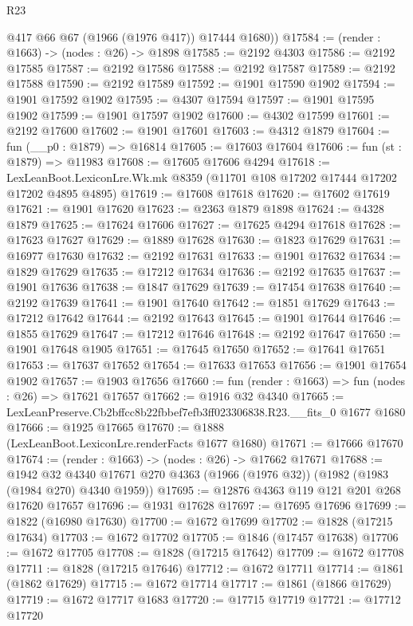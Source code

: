 \begin{lexlean}{R23}
\begin{coremodule}
        @417
        @66
        @67
        (@1966 (@1976 @417))
        @17444
        @1680))
@17584 := (render : @1663) -> (nodes : @26) -> @1898
@17585 := @2192 @4303
@17586 := @2192 @17585
@17587 := @2192 @17586
@17588 := @2192 @17587
@17589 := @2192 @17588
@17590 := @2192 @17589
@17592 := @1901 @17590 @1902
@17594 := @1901 @17592 @1902
@17595 := @4307 @17594
@17597 := @1901 @17595 @1902
@17599 := @1901 @17597 @1902
@17600 := @4302 @17599
@17601 := @2192 @17600
@17602 := @1901 @17601
@17603 := @4312 @1879
@17604 := fun (__p0 : @1879) => @16814
@17605 := @17603 @17604
@17606 := fun (st : @1879) => @11983
@17608 := @17605 @17606 @4294
@17618 := LexLeanBoot.LexiconLre.Wk.mk @8359 (@11701 @108 @17202 @17444 @17202 @17202 @4895 @4895)
@17619 := @17608 @17618
@17620 := @17602 @17619
@17621 := @1901 @17620
@17623 := @2363 @1879 @1898
@17624 := @4328 @1879
@17625 := @17624 @17606
@17627 := @17625 @4294 @17618
@17628 := @17623 @17627
@17629 := @1889 @17628
@17630 := @1823 @17629
@17631 := @16977 @17630
@17632 := @2192 @17631
@17633 := @1901 @17632
@17634 := @1829 @17629
@17635 := @17212 @17634
@17636 := @2192 @17635
@17637 := @1901 @17636
@17638 := @1847 @17629
@17639 := @17454 @17638
@17640 := @2192 @17639
@17641 := @1901 @17640
@17642 := @1851 @17629
@17643 := @17212 @17642
@17644 := @2192 @17643
@17645 := @1901 @17644
@17646 := @1855 @17629
@17647 := @17212 @17646
@17648 := @2192 @17647
@17650 := @1901 @17648 @1905
@17651 := @17645 @17650
@17652 := @17641 @17651
@17653 := @17637 @17652
@17654 := @17633 @17653
@17656 := @1901 @17654 @1902
@17657 := @1903 @17656
@17660 := fun (render : @1663) => fun (nodes : @26) => @17621 @17657
@17662 := @1916 @32 @4340
@17665 := LexLeanPreserve.Cb2bffcc8b22fbbef7efb3ff023306838.R23.__fits_0 @1677 @1680
@17666 := @1925 @17665
@17670 := @1888 (LexLeanBoot.LexiconLre.renderFacts @1677 @1680)
@17671 := @17666 @17670
@17674 := (render : @1663) -> (nodes : @26) -> @17662 @17671
@17688 := @1942
    @32
    @4340
    @17671
    @270
    @4363
    (@1966 (@1976 @32))
    (@1982 (@1983 (@1984 @270) @4340 @1959))
@17695 := @12876 @4363 @119 @121 @201 @268 @17620 @17657
@17696 := @1931 @17628
@17697 := @17695 @17696
@17699 := @1822 (@16980 @17630)
@17700 := @1672 @17699
@17702 := @1828 (@17215 @17634)
@17703 := @1672 @17702
@17705 := @1846 (@17457 @17638)
@17706 := @1672 @17705
@17708 := @1828 (@17215 @17642)
@17709 := @1672 @17708
@17711 := @1828 (@17215 @17646)
@17712 := @1672 @17711
@17714 := @1861 (@1862 @17629)
@17715 := @1672 @17714
@17717 := @1861 (@1866 @17629)
@17719 := @1672 @17717 @1683
@17720 := @17715 @17719
@17721 := @17712 @17720

\end{coremodule}
\end{lexlean}

